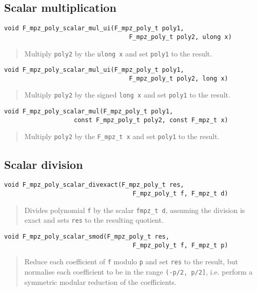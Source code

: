 \documentclass[a4paper,10pt]{article}
\newcommand{\code}{\lstinline}
\begin{document}
\subsection{Scalar multiplication}

\begin{lstlisting}
void F_mpz_poly_scalar_mul_ui(F_mpz_poly_t poly1,
                                  F_mpz_poly_t poly2, ulong x)
\end{lstlisting}
\begin{quote}
Multiply \code{poly2} by the \code{ulong x} and set \code{poly1} to the result.
\end{quote}

\begin{lstlisting}
void F_mpz_poly_scalar_mul_ui(F_mpz_poly_t poly1,
                                  F_mpz_poly_t poly2, long x)
\end{lstlisting}
\begin{quote}
Multiply \code{poly2} by the signed \code{long x} and set \code{poly1} to the result.
\end{quote}

\begin{lstlisting}
void F_mpz_poly_scalar_mul(F_mpz_poly_t poly1, 
                   const F_mpz_poly_t poly2, const F_mpz_t x)
\end{lstlisting}
\begin{quote}
Multiply \code{poly2} by the \code{F_mpz_t x} and set \code{poly1} to the result.
\end{quote}

\subsection{Scalar division}

\begin{lstlisting}
void F_mpz_poly_scalar_divexact(F_mpz_poly_t res,
                                   F_mpz_poly_t f, F_mpz_t d)
\end{lstlisting}
\begin{quote}
Divides polynomial \code{f} by the scalar \code{fmpz_t d}, assuming the division is exact and sets 
\code{res} to the resulting quotient.
\end{quote}

\begin{lstlisting}
void F_mpz_poly_scalar_smod(F_mpz_poly_t res, 
                                   F_mpz_poly_t f, F_mpz_t p)
\end{lstlisting}
\begin{quote}
Reduce each coefficient of \code{f} modulo \code{p} and set \code{res} to the result, but normalise 
each coefficient to be in the range \code{(-p/2, p/2]}, i.e. perform a symmetric modular reduction 
of the coefficients.
\end{quote}
\end{document}
